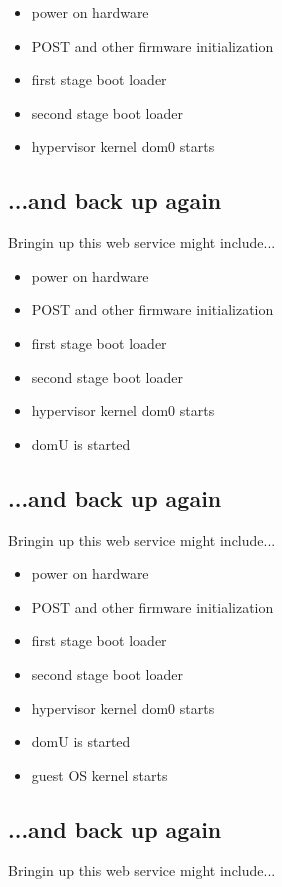 \documentclass[xga]{xdvislides}
\begin{document}
\begin{itemize}
	\item power on hardware
	\item POST and other firmware initialization
	\item first stage boot loader
	\item second stage boot loader
	\item hypervisor kernel dom0 starts
\end{itemize}

\subsection{...and back up again}
Bringin up this web service might include...
\\

\begin{itemize}
	\item power on hardware
	\item POST and other firmware initialization
	\item first stage boot loader
	\item second stage boot loader
	\item hypervisor kernel dom0 starts
	\item domU is started
\end{itemize}

\subsection{...and back up again}
Bringin up this web service might include...
\\

\begin{itemize}
	\item power on hardware
	\item POST and other firmware initialization
	\item first stage boot loader
	\item second stage boot loader
	\item hypervisor kernel dom0 starts
	\item domU is started
	\item guest OS kernel starts
\end{itemize}

\subsection{...and back up again}
Bringin up this web service might include...
\\
\end{document}
